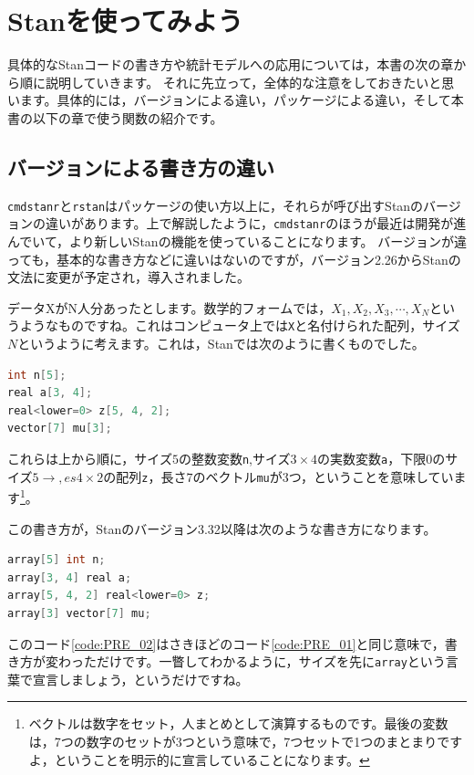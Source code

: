 \documentclass{ltjsbook}
\begin{document}
\section{Stanを使ってみよう}
具体的なStanコードの書き方や統計モデルへの応用については，本書の次の章から順に説明していきます。
それに先立って，全体的な注意をしておきたいと思います。具体的には，バージョンによる違い，パッケージによる違い，そして本書の以下の章で使う関数の紹介です。

\subsection{バージョンによる書き方の違い}
\verb|cmdstanr|と\verb|rstan|はパッケージの使い方以上に，それらが呼び出すStanのバージョンの違いがあります。上で解説したように，\verb|cmdstanr|のほうが最近は開発が進んでいて，より新しいStanの機能を使っていることになります。
バージョンが違っても，基本的な書き方などに違いはないのですが，バージョン2.26からStanの文法に変更が予定され，導入されました。


データXがN人分あったとします。数学的フォームでは，$X_1,X_2,X_3,\cdots, X_N$というようなものですね。これはコンピュータ上では\verb|X|と名付けられた配列，サイズ$N$というように考えます。これは，Stanでは次のように書くものでした。
\begin{lstlisting}[language=C++,label={code:PRE_01},caption={Stan2.26以前の書き方}]
int n[5];
real a[3, 4];
real<lower=0> z[5, 4, 2];
vector[7] mu[3];
\end{lstlisting}

これらは上から順に，サイズ$5$の整数変数\verb|n|,サイズ$3 \times 4$の実数変数\verb|a|，下限$0$のサイズ$5\to,es4\times2$の配列\verb|z|，長さ$7$のベクトル\verb|mu|が3つ，ということを意味しています\footnote{ベクトルは数字をセット，人まとめとして演算するものです。最後の変数は，7つの数字のセットが3つという意味で，7つセットで1つのまとまりですよ，ということを明示的に宣言していることになります。}。

この書き方が，Stanのバージョン3.32以降は次のような書き方になります。
\begin{lstlisting}[language=C++,label={code:PRE_02},caption={Stan2.32以降の書き方}]
array[5] int n;
array[3, 4] real a;
array[5, 4, 2] real<lower=0> z;
array[3] vector[7] mu;
\end{lstlisting}
このコード\ref{code:PRE_02}はさきほどのコード\ref{code:PRE_01}と同じ意味で，書き方が変わっただけです。一瞥してわかるように，サイズを先に\verb|array|という言葉で宣言しましょう，というだけですね。
\end{document}
